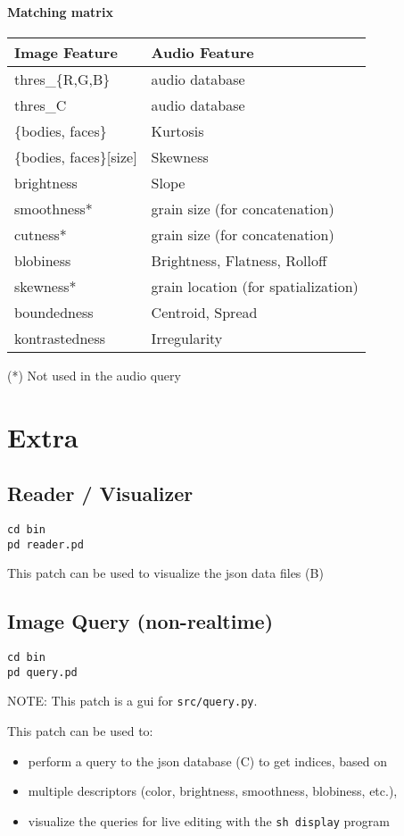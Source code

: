 \paragraph{Matching matrix}

\begin{longtable}[]{@{}ll@{}}
\toprule
Image Feature & Audio Feature\tabularnewline
\midrule
\endhead
thres\_\{R,G,B\} & audio database\tabularnewline
thres\_C & audio database\tabularnewline
\{bodies, faces\} & Kurtosis\tabularnewline
\{bodies, faces\}{[}size{]} & Skewness\tabularnewline
brightness & Slope\tabularnewline
smoothness* & grain size (for concatenation)\tabularnewline
cutness* & grain size (for concatenation)\tabularnewline
blobiness & Brightness, Flatness, Rolloff\tabularnewline
skewness* & grain location (for spatialization)\tabularnewline
boundedness & Centroid, Spread\tabularnewline
kontrastedness & Irregularity\tabularnewline
\bottomrule
\end{longtable}

(*) Not used in the audio query


\section*{Extra}


\subsection*{Reader / Visualizer}

\begin{verbatim}
cd bin
pd reader.pd
\end{verbatim}

This patch can be used to visualize the \gls{json} data files (B)




\subsection*{Image Query (non-realtime)}

\begin{verbatim}
cd bin
pd query.pd
\end{verbatim}

NOTE: This patch is a gui for \texttt{src/query.py}.

This patch can be used to:

\begin{itemize}
  \singlespacing
\tightlist
\item
  perform a query to the \gls{json} database (C) to get indices, based on
\item
  multiple descriptors (color, brightness, smoothness, blobiness, etc.),
\item
  visualize the queries for live editing with the \texttt{sh\ display} program
\end{itemize}

